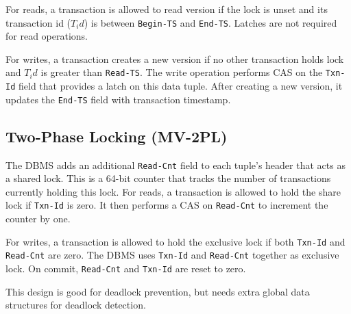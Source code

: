 \documentclass[11pt]{article}
\newcommand{\mvccField}[1]{\texttt{#1}\xspace}
\begin{document}
For reads, a transaction is allowed to read version if the lock is unset and its 
transaction id ($T_id$) is between \mvccField{Begin-TS} and \mvccField{End-TS}. Latches are not  
required for read operations.
    
For writes, a transaction creates a new version if no other transaction holds lock and 
$T_id$ is greater than \mvccField{Read-TS}. The write operation performs CAS on the 
\mvccField{Txn-Id} field that provides a latch on this data tuple. After creating a 
new version, it updates the \mvccField{End-TS} field with transaction timestamp.

\subsection*{Two-Phase Locking (MV-2PL)}
The DBMS adds an additional \mvccField{Read-Cnt} field to each tuple's header that acts as a shared 
lock. This is a 64-bit counter that tracks the number of transactions currently holding this lock.
For reads, a transaction is allowed to hold the share lock if \mvccField{Txn-Id} is zero. It 
then performs a CAS on \mvccField{Read-Cnt} to increment the counter by one.

For writes, a transaction is allowed to hold the exclusive lock if both \mvccField{Txn-Id} 
and \mvccField{Read-Cnt} are zero. The DBMS uses \mvccField{Txn-Id} and \mvccField{Read-Cnt} 
together as exclusive lock. On commit, \mvccField{Read-Cnt} and \mvccField{Txn-Id} are reset to 
zero.

This design is good for deadlock prevention, but needs extra global data structures for 
deadlock detection.

% 
%         
%         
\end{document}
